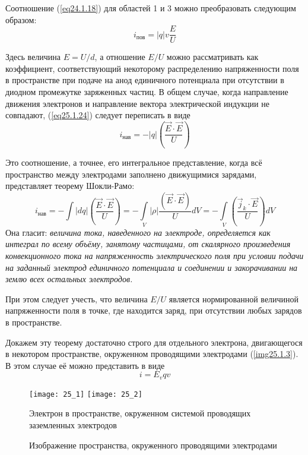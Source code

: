 
Соотношение (\ref{eq24.1.18}) для областей 1 и 3 можно преобразовать следующим 
образом:
\begin{equation}
	i_\text{пов} = |q|v\frac{E}{U}
	\label{eq25.1.24}
\end{equation}

Здесь величина \( E = U/d \), а отношение \( E/U \) можно рассматривать как 
коэффициент, соответствующий некоторому распределению напряженности поля в 
пространстве при подаче на анод единичного потенциала при отсутствии в диодном 
промежутке заряженных частиц. В общем случае, когда направление движения 
электронов и направление вектора электрической индукции не совпадают, 
(\ref{eq25.1.24}) следует переписать в виде
\[
	i_\text{нав} = -|q|\left( \frac{\vec{E}\cdot\vec{E}}{U} \right)
\]

Это соотношение, а точнее, его интегральное представление, когда всё 
пространство между электродами заполнено движущимися зарядами, представляет 
теорему Шокли-Рамо:
\[
	i_\text{нав} = -\int |dq|\left( \frac{\vec{E}\cdot\vec{E}}{U} \right) = 
		-\int\limits_V |\rho| \frac{(\vec{E}\cdot\vec{E})}{U} dV = 
		-\int\limits_V \left( \frac{\vec{j}_k\cdot\vec{E}}{U} \right)dV
\]
Она гласит: \emph{величина тока, наведенного на электроде, определяется как 
интеграл по всему объёму, занятому частицами, от скалярного произведения 
конвекционного тока на напряженность электрического поля при условии подачи 
на заданный электрод единичного потенциала и соединении и закорачивании на 
землю всех остальных электродов.}

При этом следует учесть, что величина \( E/U \) является нормированной 
величиной напряженности поля в точке, где находится заряд, при отсутствии 
любых зарядов в пространстве.

Докажем эту теорему достаточно строго для отдельного электрона, двигающегося 
в некотором пространстве, окруженном проводящими электродами 
(\ref{img25.1.3}). В этом случае её можно представить в виде
\[
	i = E_v qv
\]

\begin{figure}[h!]
	\center
	\texttt{[image: 25\_1]} \hspace{1em}
	\texttt{[image: 25\_2]}
	\parbox{.4\textwidth}{\caption{Электрон в пространстве, окруженном 
		системой проводящих заземленных электродов}
	\label{img25.1.3}} \hspace{1em}
	\parbox{.4\textwidth}{\caption{Изображение пространства, окруженного 
		проводящими электродами}
    \label{img25.1.4}}
\end{figure}

